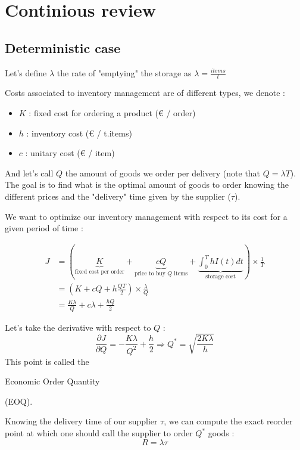 \section{Continious review}
\subsection{Deterministic case}

\par Let's define $\lambda$ the rate of "emptying" the storage as $\lambda=\frac{items}{t}$

\par [Schema]

\par Costs associated to inventory management are of different types, we denote :  
\begin{itemize}
    \item $K$ : fixed cost for ordering a product (€ / order)
    \item $h$ : inventory cost (€ / t.items)
    \item $c$ : unitary cost (€ / item)
\end{itemize}
And let's call $Q$ the amount of goods we order per delivery (note that $Q=\lambda T$). The goal is to find what is the optimal amount of goods to order knowing the different prices and the "delivery" time given by the supplier ($\tau$).

We want to optimize our inventory management with respect to its cost for a given period of time : 

\[
    \begin{split}
    J &= \left( \underbrace{K}_{\textrm{fixed cost per order}} + \underbrace{cQ}_{\textrm{price to buy }Q\textrm{ items}} + \underbrace{\int_0^ThI(t)dt}_{\textrm{storage cost}} \right) \times \frac{1}{T} \\
    &= \left( K + cQ + h\frac{QT}{2} \right) \times \frac{\lambda}{Q} \\
    &= \frac{K\lambda}{Q} + c\lambda + \frac{hQ}2
    \end{split}
\]

Let's take the derivative with respect to $Q$ :
\[
    \frac{\partial J}{\partial Q} = -\frac{K\lambda}{Q^2} + \frac{h}{2} \Rightarrow Q^* = \sqrt{\frac{2K\lambda}{h}}
\]
This point is called the \begin{textbf}{Economic Order Quantity}\end{textbf} (EOQ). 

Knowing the delivery time of our supplier $\tau$, we can compute the exact reorder point at which one should call the supplier to order $Q^*$ goods : 
\[ R = \lambda\tau \]

